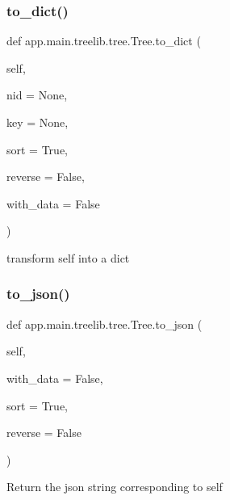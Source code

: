 \subsubsection{\texorpdfstring{to\+\_\+dict()}{to\_dict()}}
{\footnotesize\ttfamily def app.\+main.\+treelib.\+tree.\+Tree.\+to\+\_\+dict (\begin{DoxyParamCaption}\item[{}]{self,  }\item[{}]{nid = {\ttfamily None},  }\item[{}]{key = {\ttfamily None},  }\item[{}]{sort = {\ttfamily True},  }\item[{}]{reverse = {\ttfamily False},  }\item[{}]{with\+\_\+data = {\ttfamily False} }\end{DoxyParamCaption})}

\begin{DoxyVerb}transform self into a dict\end{DoxyVerb}
 \mbox{\label{classapp_1_1main_1_1treelib_1_1tree_1_1Tree_aa2a265f8990cbd53fbf80f5ef5b49b20}} 
\subsubsection{\texorpdfstring{to\+\_\+json()}{to\_json()}}
{\footnotesize\ttfamily def app.\+main.\+treelib.\+tree.\+Tree.\+to\+\_\+json (\begin{DoxyParamCaption}\item[{}]{self,  }\item[{}]{with\+\_\+data = {\ttfamily False},  }\item[{}]{sort = {\ttfamily True},  }\item[{}]{reverse = {\ttfamily False} }\end{DoxyParamCaption})}

\begin{DoxyVerb}Return the json string corresponding to self\end{DoxyVerb}
 \mbox{\label{classapp_1_1main_1_1treelib_1_1tree_1_1Tree_a2cdb045aff10eb712ef0109997553a25}} 
